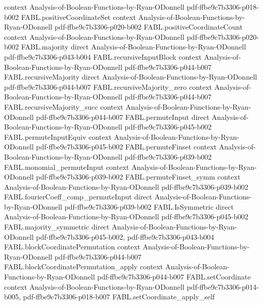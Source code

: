 \begin{theorem}
  {context}
  {Analysis-of-Boolean-Functions-by-Ryan-ODonnell}
  {pdf-ffbe9c7b3306-p018-b002}
\proofstep
  {FABL.positiveCoordinateSet}
  {context}
  {Analysis-of-Boolean-Functions-by-Ryan-ODonnell}
  {pdf-ffbe9c7b3306-p020-b002}
\proofstep
  {FABL.positiveCoordinateCount}
  {context}
  {Analysis-of-Boolean-Functions-by-Ryan-ODonnell}
  {pdf-ffbe9c7b3306-p020-b002}
\proofstep
  {FABL.majority}
  {direct}
  {Analysis-of-Boolean-Functions-by-Ryan-ODonnell}
  {pdf-ffbe9c7b3306-p043-b004}
\proofstep
  {FABL.recursiveInputBlock}
  {context}
  {Analysis-of-Boolean-Functions-by-Ryan-ODonnell}
  {pdf-ffbe9c7b3306-p044-b007}
\proofstep
  {FABL.recursiveMajority}
  {direct}
  {Analysis-of-Boolean-Functions-by-Ryan-ODonnell}
  {pdf-ffbe9c7b3306-p044-b007}
\proofstep
  {FABL.recursiveMajority_zero}
  {context}
  {Analysis-of-Boolean-Functions-by-Ryan-ODonnell}
  {pdf-ffbe9c7b3306-p044-b007}
\proofstep
  {FABL.recursiveMajority_succ}
  {context}
  {Analysis-of-Boolean-Functions-by-Ryan-ODonnell}
  {pdf-ffbe9c7b3306-p044-b007}
\proofstep
  {FABL.permuteInput}
  {direct}
  {Analysis-of-Boolean-Functions-by-Ryan-ODonnell}
  {pdf-ffbe9c7b3306-p045-b002}
\proofstep
  {FABL.permuteInputEquiv}
  {context}
  {Analysis-of-Boolean-Functions-by-Ryan-ODonnell}
  {pdf-ffbe9c7b3306-p045-b002}
\proofstep
  {FABL.permuteFinset}
  {context}
  {Analysis-of-Boolean-Functions-by-Ryan-ODonnell}
  {pdf-ffbe9c7b3306-p039-b002}
\proofstep
  {FABL.monomial_permuteInput}
  {context}
  {Analysis-of-Boolean-Functions-by-Ryan-ODonnell}
  {pdf-ffbe9c7b3306-p039-b002}
\proofstep
  {FABL.permuteFinset_symm}
  {context}
  {Analysis-of-Boolean-Functions-by-Ryan-ODonnell}
  {pdf-ffbe9c7b3306-p039-b002}
\proofstep
  {FABL.fourierCoeff_comp_permuteInput}
  {direct}
  {Analysis-of-Boolean-Functions-by-Ryan-ODonnell}
  {pdf-ffbe9c7b3306-p039-b002}
\proofstep
  {FABL.IsSymmetric}
  {direct}
  {Analysis-of-Boolean-Functions-by-Ryan-ODonnell}
  {pdf-ffbe9c7b3306-p045-b002}
\proofstep
  {FABL.majority_symmetric}
  {direct}
  {Analysis-of-Boolean-Functions-by-Ryan-ODonnell}
  {pdf-ffbe9c7b3306-p045-b002,
    pdf-ffbe9c7b3306-p043-b004}
\proofstep
  {FABL.blockCoordinatePermutation}
  {context}
  {Analysis-of-Boolean-Functions-by-Ryan-ODonnell}
  {pdf-ffbe9c7b3306-p044-b007}
\proofstep
  {FABL.blockCoordinatePermutation_apply}
  {context}
  {Analysis-of-Boolean-Functions-by-Ryan-ODonnell}
  {pdf-ffbe9c7b3306-p044-b007}
\proofstep
  {FABL.setCoordinate}
  {context}
  {Analysis-of-Boolean-Functions-by-Ryan-ODonnell}
  {pdf-ffbe9c7b3306-p014-b005,
    pdf-ffbe9c7b3306-p018-b007}
\proofstep
  {FABL.setCoordinate_apply_self}

\end{theorem}
